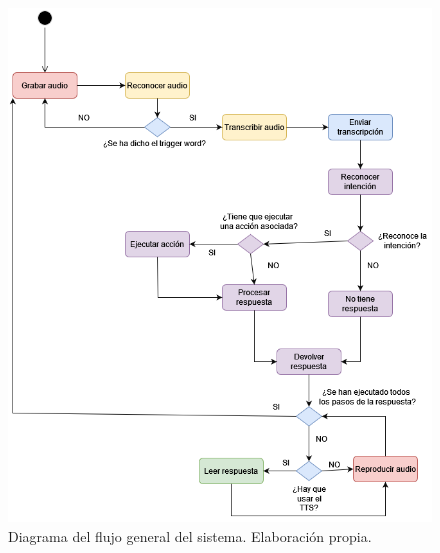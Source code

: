  
 \begin{figure}[H]
 	\includegraphics[width=\textwidth]{imagenes/DiagramaFlujo.png}
 	\caption{Diagrama del flujo general del sistema. Elaboración propia.}
 \end{figure}

 
